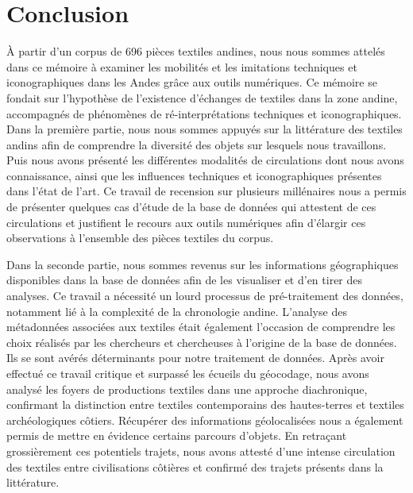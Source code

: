 \chapter*{Conclusion}

À partir d'un corpus de 696 pièces textiles andines, nous nous sommes attelés dans ce mémoire à examiner les mobilités et les imitations techniques et iconographiques dans les Andes grâce aux outils numériques. Ce mémoire se fondait sur l'hypothèse de l'existence d'échanges de textiles dans la zone andine, accompagnés de phénomènes de ré-interprétations techniques et iconographiques. \\

Dans la première partie, nous nous sommes appuyés sur la littérature des textiles andins afin de comprendre la diversité des objets sur lesquels nous travaillons. Puis nous avons présenté les différentes modalités de circulations dont nous avons connaissance, ainsi que les influences techniques et iconographiques présentes dans l'état de l'art. Ce travail de recension sur plusieurs millénaires nous a permis de présenter quelques cas d'étude de la base de données qui attestent de ces circulations et justifient le recours aux outils numériques afin d'élargir ces observations à l'ensemble des pièces textiles du corpus. %

Dans la seconde partie, nous sommes revenus sur les informations géographiques disponibles dans la base de données afin de les visualiser et d'en tirer des analyses. Ce travail a nécessité un lourd processus de pré-traitement des données, notamment lié à la complexité de la chronologie andine. L'analyse des métadonnées associées aux textiles était également l'occasion de comprendre les choix réalisés par les chercheurs et chercheuses à l'origine de la base de données. Ils se sont avérés déterminants pour notre traitement de données. Après avoir effectué ce travail critique et surpassé les écueils du géocodage, nous avons analysé les foyers de productions textiles dans une approche diachronique, confirmant la distinction entre textiles contemporains des hautes-terres et textiles archéologiques côtiers. Récupérer des informations géolocalisées nous a également permis de mettre en évidence certains parcours d'objets. En retraçant grossièrement ces potentiels trajets, nous avons attesté d'une intense circulation des textiles entre civilisations côtières et confirmé des trajets présents dans la littérature. 

